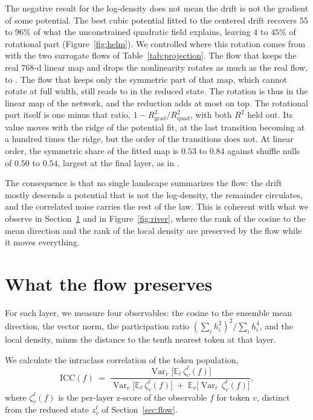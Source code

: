 \documentclass[mlmain]{jmlr}
\begin{document}
The negative result for the log-density does not mean the drift is not the gradient of some potential. 
The best cubic potential fitted to the centered drift recovers $55$ to $96\%$ of what the unconstrained
quadratic field explains, leaving $4$ to $45\%$ of rotational part
(Figure~\ref{fig:helm}). We controlled where this rotation comes
from with the two surrogate flows of Table~\ref{tab:projection}. The
flow that keeps the real $768$-d linear map and drops the nonlinearity
rotates as much as the real flow, \crProjAffCircMin{} to
\crProjAffCircMax{}. The flow that keeps only the symmetric part of
that map, which cannot rotate at full width, still reads
\crProjGradCircMin{} to \crProjGradCircMax{} in the reduced state. The
rotation is thus in the linear map of the network, and the reduction
adds at most \crProjGradCircMax{} on top. The rotational part itself is
one minus that ratio, $1 - R^2_{\mathrm{grad}}/R^2_{\mathrm{quad}}$,
with both $R^2$ held out. Its value moves with the ridge of the
potential fit, \crHelmMin{} at the last transition becoming
\crRidgeExitLoose{} at a hundred times the ridge, but the order of the
transitions does not. At linear order, the symmetric share of the
fitted map is $0.53$ to $0.84$ against shuffle nulls of $0.50$ to
$0.54$, largest at the final layer, as in \citet{fernando2026spectral}.

The consequence is that no single landscape summarizes the flow: the
drift mostly descends a potential that is not the log-density, the
remainder circulates, and the correlated noise carries the rest of the
law. This is coherent with what we observe in
Section~\ref{sec:conservation} and in Figure~\ref{fig:river}, where the
rank of the cosine to the mean direction and the rank of the local
density are preserved by the flow while it moves everything.

\section{What the flow preserves}
\label{sec:conservation}

For each layer, we measure four observables: the
cosine to the ensemble mean direction, the vector norm, the
participation ratio $(\sum_i h_i^2)^2 / \sum_i h_i^4$, and the local
density, minus the distance to the tenth nearest token at that layer.

We calculate the intraclass correlation of the token population,
\[
  \mathrm{ICC}(f) \;=\;
  \frac{\operatorname{Var}_v\big[\mathbb{E}_\ell\, \zeta^\ell_v(f)\big]}
  {\operatorname{Var}_v\big[\mathbb{E}_\ell\, \zeta^\ell_v(f)\big]
   \;+\; \mathbb{E}_v\big[\operatorname{Var}_\ell\, \zeta^\ell_v(f)\big]} ,
\]
where $\zeta^\ell_v(f)$ is the per-layer z-score of the observable
$f$ for token $v$, distinct from the reduced state $z^\ell_v$ of
Section~\ref{sec:flow}.
\end{document}
